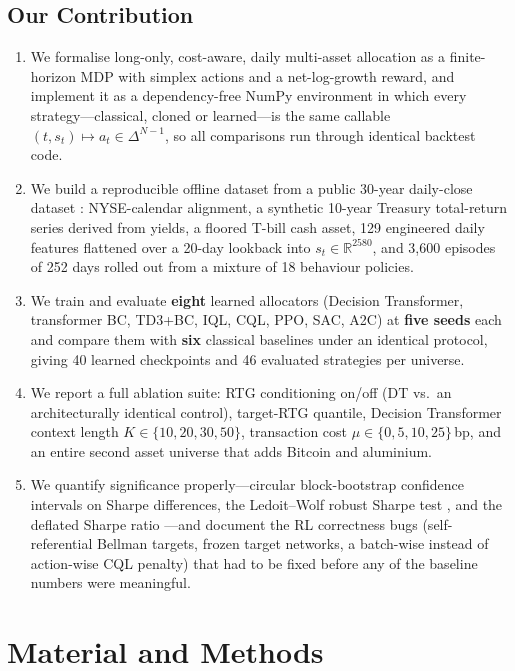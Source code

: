 \documentclass[11pt]{article}
\begin{document}
\subsection{Our Contribution}
\begin{enumerate}
  \item We formalise long-only, cost-aware, daily multi-asset allocation as a finite-horizon
        MDP with simplex actions and a net-log-growth reward, and implement it as a
        dependency-free NumPy environment in which every strategy---classical, cloned or
        learned---is the same callable $(t, s_t) \mapsto a_t \in \Delta^{N-1}$, so all
        comparisons run through identical backtest code.
  \item We build a reproducible offline dataset from a public 30-year daily-close dataset
        \cite{islam2025dataset}: NYSE-calendar alignment, a synthetic 10-year Treasury
        total-return series derived from yields, a floored T-bill cash asset, 129 engineered
        daily features flattened over a 20-day lookback into $s_t \in \mathbb{R}^{2580}$, and
        3{,}600 episodes of 252 days rolled out from a mixture of 18 behaviour policies.
  \item We train and evaluate \textbf{eight} learned allocators (Decision Transformer,
        transformer BC, TD3+BC, IQL, CQL, PPO, SAC, A2C) at \textbf{five seeds} each and
        compare them with \textbf{six} classical baselines under an identical protocol, giving
        40 learned checkpoints and 46 evaluated strategies per universe.
  \item We report a full ablation suite: RTG conditioning on/off (DT vs.\ an architecturally
        identical control), target-RTG quantile, Decision Transformer context length
        $K \in \{10,20,30,50\}$, transaction cost $\mu \in \{0, 5, 10, 25\}$\,bp, and an
        entire second asset universe that adds Bitcoin and aluminium.
  \item We quantify significance properly---circular block-bootstrap confidence intervals on
        Sharpe differences, the Ledoit--Wolf robust Sharpe test \cite{ledoit2008robust}, and
        the deflated Sharpe ratio \cite{bailey2014deflated}---and document the RL correctness
        bugs (self-referential Bellman targets, frozen target networks, a batch-wise instead
        of action-wise CQL penalty) that had to be fixed before any of the baseline numbers
        were meaningful.
\end{enumerate}

\section{Material and Methods}
\end{document}
